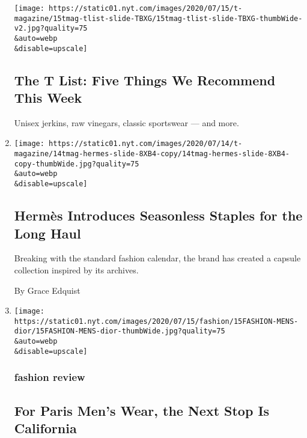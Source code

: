 \begin{enumerate}
  \texttt{[image: https://static01.nyt.com/images/2020/07/15/t-magazine/15tmag-tlist-slide-TBXG/15tmag-tlist-slide-TBXG-thumbWide-v2.jpg?quality=75\\\&auto=webp\\\&disable=upscale]}

  \hypertarget{the-t-list-five-things-we-recommend-this-week-2}{%
  \subsection{The T List: Five Things We Recommend This
  Week}\label{the-t-list-five-things-we-recommend-this-week-2}}

  Unisex jerkins, raw vinegars, classic sportswear --- and more.
\item
  \href{/2020/07/15/t-magazine/hermes-fashion-savoir-faire.html}{}

  \texttt{[image: https://static01.nyt.com/images/2020/07/14/t-magazine/14tmag-hermes-slide-8XB4-copy/14tmag-hermes-slide-8XB4-copy-thumbWide.jpg?quality=75\\\&auto=webp\\\&disable=upscale]}

  \hypertarget{hermuxe8s-introduces-seasonless-staples-for-the-long-haul}{%
  \subsection{Hermès Introduces Seasonless Staples for the Long
  Haul}\label{hermuxe8s-introduces-seasonless-staples-for-the-long-haul}}

  Breaking with the standard fashion calendar, the brand has created a
  capsule collection inspired by its archives.

  By Grace Edquist
\item
  \href{/2020/07/15/style/mens-fashion-for-paris-mens-wear-next-stop-california.html}{}

  \texttt{[image: https://static01.nyt.com/images/2020/07/15/fashion/15FASHION-MENS-dior/15FASHION-MENS-dior-thumbWide.jpg?quality=75\\\&auto=webp\\\&disable=upscale]}

  \hypertarget{fashion-review-1}{%
  \subsubsection{fashion review}\label{fashion-review-1}}

  \hypertarget{for-paris-mens-wear-the-next-stop-is-california}{%
  \subsection{For Paris Men's Wear, the Next Stop Is
  California}\label{for-paris-mens-wear-the-next-stop-is-california}}


\end{enumerate}
